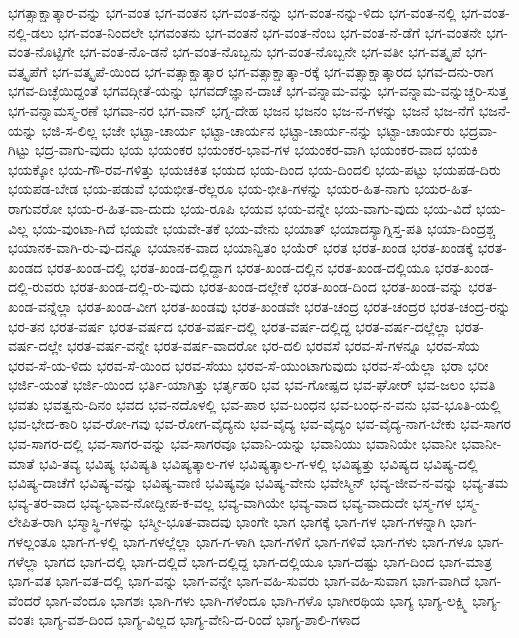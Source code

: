 ಭಗತ್ಸಾಕ್ಷಾತ್ಕಾರ-ವನ್ನು
ಭಗ-ವಂತ
ಭಗ-ವಂತನ
ಭಗ-ವಂತ-ನನ್ನು
ಭಗ-ವಂತ-ನನ್ನು-ಳಿದು
ಭಗ-ವಂತ-ನಲ್ಲಿ
ಭಗ-ವಂತ-ನಲ್ಲಿ-ಡಲು
ಭಗ-ವಂತ-ನಿಂದಲೇ
ಭಗವಂತನು
ಭಗ-ವಂತನೆ
ಭಗ-ವಂತ-ನೆಂಬ
ಭಗ-ವಂತ-ನೆ-ಡೆಗೆ
ಭಗ-ವಂತನೇ
ಭಗ-ವಂತ-ನೊಟ್ಟಿಗೇ
ಭಗ-ವಂತ-ನೊ-ಡನೆ
ಭಗ-ವಂತ-ನೊಬ್ಬನು
ಭಗ-ವಂತ-ನೊಬ್ಬನೇ
ಭಗ-ವತೀ
ಭಗ-ವತ್ಕೃಪೆ
ಭಗ-ವತ್ಕೃಪೆಗೆ
ಭಗ-ವತ್ಕೃಪೆ-ಯಿಂದ
ಭಗ-ವತ್ಸಾಕ್ಷಾತ್ಕಾರ
ಭಗ-ವತ್ಸಾಕ್ಷಾತ್ಕಾ-ರಕ್ಕೆ
ಭಗ-ವತ್ಸಾಕ್ಷಾತ್ಕಾರದ
ಭಗವ-ದನು-ರಾಗ
ಭಗವ-ದಿಚ್ಛೆಯಿದ್ದಂತೆ
ಭಗವದ್ಗೀತೆ-ಯನ್ನು
ಭಗವದ್‌ಜ್ಞಾನ-ದಾಚೆ
ಭಗ-ವನ್ನಾಮ-ವನ್ನು
ಭಗ-ವನ್ನಾಮ-ವನ್ನುಚ್ಚರಿ-ಸುತ್ತ
ಭಗ-ವನ್ನಾಮಸ್ಮ-ರಣೆ
ಭಗವಾ-ನರ
ಭಗ-ವಾನ್
ಭಗ್ನ-ದೇಹ
ಭಜನ
ಭಜನಂ
ಭಜ-ನ-ಗಳನ್ನು
ಭಜನೆ
ಭಜ-ನೆಗೆ
ಭಜನೆ-ಯನ್ನು
ಭಜಿ-ಸ-ಲಿಲ್ಲ
ಭಜೇ
ಭಟ್ಟಾ-ಚಾರ್ಯ
ಭಟ್ಟಾ-ಚಾರ್ಯನ
ಭಟ್ಟಾ-ಚಾರ್ಯ-ನನ್ನು
ಭಟ್ಟಾ-ಚಾರ್ಯರು
ಭದ್ರವಾ-ಗಿಟ್ಟು
ಭದ್ರ-ವಾಗು-ವುದು
ಭಯ
ಭಯಂಕರ
ಭಯಂಕರ-ಭಾವ-ಗಳ
ಭಯಂಕರ-ವಾಗಿ
ಭಯಂಕರ-ವಾದ
ಭಯಕಿ
ಭಯಕ್ಕೋ
ಭಯ-ಗೌ-ರವ-ಗಳಿತ್ತು
ಭಯಚಕಿತ
ಭಯದ
ಭಯ-ದಿಂದ
ಭಯ-ದಿಂದಲಿ
ಭಯ-ಪಟ್ಟು
ಭಯಪಡ-ದಿರು
ಭಯಪಡ-ಬೇಡ
ಭಯ-ಪಡುವೆ
ಭಯಭೀತ-ರೆಲ್ಲರೂ
ಭಯ-ಭೀತಿ-ಗಳನ್ನು
ಭಯರ-ಹಿತ-ನಾಗು
ಭಯರ-ಹಿತ-ರಾಗುವರೋ
ಭಯ-ರ-ಹಿತ-ವಾ-ದುದು
ಭಯ-ರೂಪಿ
ಭಯವ
ಭಯ-ವನ್ನೇ
ಭಯ-ವಾಗು-ವುದು
ಭಯ-ವಿದೆ
ಭಯ-ವಿಲ್ಲ
ಭಯ-ವುಂಟಾ-ಗಿದೆ
ಭಯವೇ
ಭಯವೇ-ತಕೆ
ಭಯ-ವೇನು
ಭಯಾತ್
ಭಯಾದಸ್ಯಾಗ್ನಿಸ್ತ-ಪತಿ
ಭಯಾ-ದಿಂದ್ರಶ್ಚ
ಭಯಾನಕ-ವಾಗಿ-ರು-ವು-ದನ್ನೂ
ಭಯಾನಕ-ವಾದ
ಭಯಾನ್ವಿತಂ
ಭಯೆರ್
ಭರತ
ಭರತ-ಖಂಡ
ಭರತ-ಖಂಡಕ್ಕೆ
ಭರತ-ಖಂಡದ
ಭರತ-ಖಂಡ-ದಲ್ಲಿ
ಭರತ-ಖಂಡ-ದಲ್ಲಿದ್ದಾಗ
ಭರತ-ಖಂಡ-ದಲ್ಲಿನ
ಭರತ-ಖಂಡ-ದಲ್ಲಿಯೂ
ಭರತ-ಖಂಡ-ದಲ್ಲಿ-ರುವರು
ಭರತ-ಖಂಡ-ದಲ್ಲಿ-ರು-ವುದು
ಭರತ-ಖಂಡ-ದಲ್ಲೇಕೆ
ಭರತ-ಖಂಡ-ದಿಂದ
ಭರತ-ಖಂಡ-ವನ್ನು
ಭರತ-ಖಂಡ-ವನ್ನೆಲ್ಲಾ
ಭರತ-ಖಂಡ-ವೀಗ
ಭರತ-ಖಂಡವು
ಭರತ-ಖಂಡವೇ
ಭರತ-ಚಂದ್ರ
ಭರತ-ಚಂದ್ರರ
ಭರತ-ಚಂದ್ರ-ರನ್ನು
ಭರ-ತನ
ಭರತ-ವರ್ಷ
ಭರತ-ವರ್ಷದ
ಭರತ-ವರ್ಷ-ದಲ್ಲಿ
ಭರತ-ವರ್ಷ-ದಲ್ಲಿದ್ದ
ಭರತ-ವರ್ಷ-ದಲ್ಲೆಲ್ಲಾ
ಭರತ-ವರ್ಷ-ದಲ್ಲೇ
ಭರತ-ವರ್ಷ-ವನ್ನೇ
ಭರತ-ವರ್ಷ-ವಾದರೋ
ಭರ-ದಲಿ
ಭರವಸೆ
ಭರವ-ಸೆ-ಗಳನ್ನೂ
ಭರವ-ಸೆಯ
ಭರವ-ಸೆ-ಯ-ಳಿದು
ಭರವ-ಸೆ-ಯಿಂದ
ಭರವ-ಸೆಯು
ಭರವ-ಸೆ-ಯುಂಟಾಗುವುದು
ಭರವ-ಸೆ-ಯೆಲ್ಲಾ
ಭರಾ
ಭರೀ
ಭರ್ಜಿ-ಯಂತೆ
ಭರ್ಜಿ-ಯಿಂದ
ಭರ್ತಿ-ಯಾಗಿತ್ತು
ಭರ್ತೃಹರಿ
ಭವ
ಭವ-ಗೋಷ್ಪದ
ಭವ-ಘೋರ್
ಭವ-ಜಲಂ
ಭವತಿ
ಭವತು
ಭವತ್ವನು-ದಿನಂ
ಭವದ
ಭವ-ನದೊಳಲ್ಲಿ
ಭವ-ಪಾರ
ಭವ-ಬಂಧನ
ಭವ-ಬಂಧ-ನ-ವನು
ಭವ-ಭೂತಿ-ಯಲ್ಲಿ
ಭವ-ಭೇದ-ಕಾರಿ
ಭವ-ರೋ-ಗವು
ಭವ-ರೋಗ-ವೈದ್ಯನು
ಭವ-ವೈದ್ಯ
ಭವ-ವೈದ್ಯಂ
ಭವ-ವೈದ್ಯ-ನಾಗ-ಬೇಕು
ಭವ-ಸಾಗರ
ಭವ-ಸಾಗರ-ದಲ್ಲಿ
ಭವ-ಸಾಗರ-ವನ್ನು
ಭವ-ಸಾಗರವೂ
ಭವಾನಿ-ಯನ್ನು
ಭವಾನಿಯು
ಭವಾನಿಯೇ
ಭವಾನೀ
ಭವಾನೀ-ಮಾತೆ
ಭವಿ-ತವ್ಯ
ಭವಿಷ್ಯ
ಭವಿಷ್ಯತಿ
ಭವಿಷ್ಯತ್ಕಾಲ-ಗಳ
ಭವಿಷ್ಯತ್ಕಾಲ-ಗ-ಳಲ್ಲಿ
ಭವಿಷ್ಯತ್ತು
ಭವಿಷ್ಯದ
ಭವಿಷ್ಯ-ದಲ್ಲಿ
ಭವಿಷ್ಯ-ದಾಚೆಗೆ
ಭವಿಷ್ಯ-ವನ್ನು
ಭವಿಷ್ಯ-ವಾಣಿ
ಭವಿಷ್ಯವೂ
ಭವಿಷ್ಯ-ವೇನು
ಭವೇಸ್ಮಿನ್
ಭವ್ಯ-ಜೀವ-ನ-ವನ್ನು
ಭವ್ಯ-ತಮ
ಭವ್ಯ-ತರ-ವಾದ
ಭವ್ಯ-ಭಾವ-ನೋದ್ದೀಪ-ಕ-ವಲ್ಲ
ಭವ್ಯ-ವಾಗಿಯೇ
ಭವ್ಯ-ವಾದ
ಭವ್ಯ-ವಾದುದೇ
ಭಸ್ಮ-ಗಳ
ಭಸ್ಮ-ಲೇಪಿತ-ರಾಗಿ
ಭಸ್ಮಾಸ್ಥಿ-ಗಳನ್ನು
ಭಸ್ಮೀ-ಭೂತ-ವಾದವು
ಭಾಂಗೇ
ಭಾಗ
ಭಾಗಕ್ಕೆ
ಭಾಗ-ಗಳ
ಭಾಗ-ಗಳನ್ನಾಗಿ
ಭಾಗ-ಗಳಲ್ಲಂತೂ
ಭಾಗ-ಗ-ಳಲ್ಲಿ
ಭಾಗ-ಗಳಲ್ಲೆಲ್ಲಾ
ಭಾಗ-ಗ-ಳಾಗಿ
ಭಾಗ-ಗಳಿಗೆ
ಭಾಗ-ಗಳಿವೆ
ಭಾಗ-ಗಳು
ಭಾಗ-ಗಳೂ
ಭಾಗ-ಗಳೆಲ್ಲಾ
ಭಾಗದ
ಭಾಗ-ದಲ್ಲಿ
ಭಾಗ-ದಲ್ಲಿದೆ
ಭಾಗ-ದಲ್ಲಿದ್ದ
ಭಾಗ-ದಲ್ಲಿಯೂ
ಭಾಗ-ದಷ್ಟು
ಭಾಗ-ದಿಂದ
ಭಾಗ-ಮಾತ್ರ
ಭಾಗ-ವತ
ಭಾಗ-ವತ-ದಲ್ಲಿ
ಭಾಗ-ವನ್ನು
ಭಾಗ-ವನ್ನೇ
ಭಾಗ-ವಹಿ-ಸುವರು
ಭಾಗ-ವಹಿ-ಸುವಾಗ
ಭಾಗ-ವಾಗಿದೆ
ಭಾಗ-ವೆಂದರೆ
ಭಾಗ-ವೆಂದೂ
ಭಾಗಶಃ
ಭಾಗಿ-ಗಳು
ಭಾಗಿ-ಗಳೆಂದೂ
ಭಾಗಿ-ಗಳೊ
ಭಾಗೀರಥಿಯ
ಭಾಗ್ಯ
ಭಾಗ್ಯ-ಲಕ್ಷ್ಮಿ
ಭಾಗ್ಯ-ವಂತಃ
ಭಾಗ್ಯ-ವಶ-ದಿಂದ
ಭಾಗ್ಯ-ವಿಲ್ಲದ
ಭಾಗ್ಯ-ವೇನಿ-ದ-ರಿಂದೆ
ಭಾಗ್ಯ-ಶಾಲಿ-ಗಳಾದ
